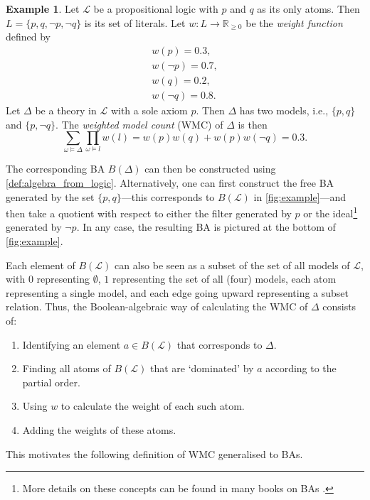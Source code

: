 \documentclass{article}
\theoremstyle{definition}
\newtheorem{example}{Example}
\theoremstyle{remark}
\begin{document}
\begin{example} \label{example:construction}
  Let $\mathcal{L}$ be a propositional logic with $p$ and $q$ as its only atoms.
  Then $L = \{ p, q, \neg p, \neg q \}$ is its set of literals. Let $w : L \to
  \mathbb{R}_{\ge 0}$ be the \emph{weight function} defined by
  \begin{align*}
    w(p) = 0.3, \\
    w(\neg p) = 0.7, \\
    w(q) = 0.2, \\
    w(\neg q) = 0.8.
  \end{align*}
  Let $\Delta$ be a theory in $\mathcal{L}$ with a sole axiom $p$. Then
  $\Delta$ has two models, i.e., $\{ p, q \}$ and $\{ p, \neg q \}$. The
  \emph{weighted model count} (WMC) \cite{DBLP:journals/ai/ChaviraD08} of $\Delta$ is
  then
  \[
    \sum_{\omega \models \Delta} \prod_{\omega \models l} w(l) =
    w(p)w(q) + w(p)w(\neg q) = 0.3.
  \]

  The corresponding BA $B(\Delta)$ can then be constructed using
  \cref{def:algebra_from_logic}. Alternatively, one can first construct the free
  BA generated by the set $\{ p, q \}$---this corresponds to $B(\mathcal{L})$ in
  \cref{fig:example}---and then take a quotient with respect to either the
  filter generated by $p$ or the ideal\footnote{More details on these concepts
    can be found in many books on BAs
    \cite{givant2008introduction,koppelberg1989handbook}.} generated by $\neg
  p$. In any case, the resulting BA is pictured at the bottom of
  \cref{fig:example}.

  Each element of $B(\mathcal{L})$ can also be seen as a subset of the set of
  all models of $\mathcal{L}$, with $0$ representing $\emptyset$, $1$
  representing the set of all (four) models, each atom representing a single
  model, and each edge going upward representing a subset relation. Thus,
  the Boolean-algebraic way of calculating the WMC of $\Delta$ consists of:
  \begin{enumerate} %
  \item Identifying an element $a \in B(\mathcal{L})$ that corresponds to
    $\Delta$.
  \item Finding all atoms of $B(\mathcal{L})$ that are `dominated' by $a$
    according to the partial order.
  \item Using $w$ to calculate the weight of each such atom.
  \item Adding the weights of these atoms.
  \end{enumerate}
  This motivates the following definition of WMC generalised to BAs.
\end{example}
\end{document}
